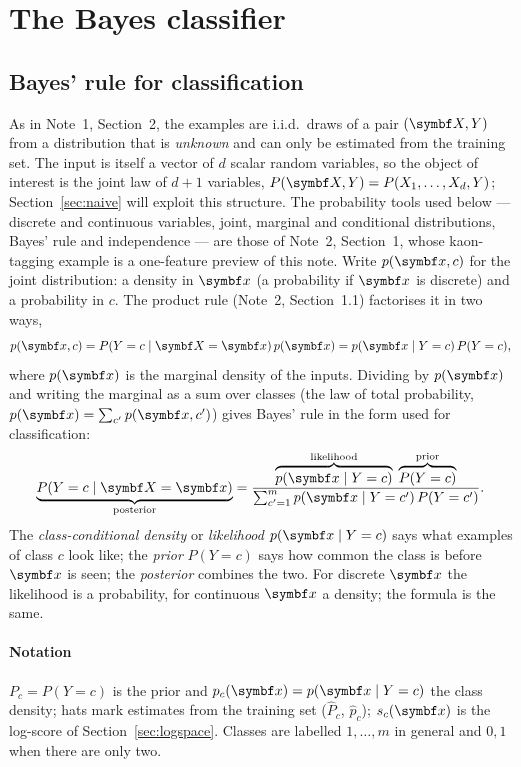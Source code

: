 \documentclass[11pt]{article}
\begin{document}
\section{The Bayes classifier}\label{sec:bayes}

\subsection{Bayes' rule for classification}

As in Note~1, Section~2, the examples are i.i.d.\ draws of a pair $(\X, Y)$ from a distribution that is \emph{unknown}
and can only be estimated from the training set. The input is itself a vector of $d$ scalar random variables, so the
object of interest is the joint law of $d + 1$ variables, $P(\X, Y) = P(X_1, \dots, X_d, Y)$; Section~\ref{sec:naive}
will exploit this structure. The probability tools used below --- discrete and continuous variables, joint, marginal and
conditional distributions, Bayes' rule and independence --- are those of Note~2, Section~1, whose kaon-tagging example is
a one-feature preview of this note. Write
$p(\x, c)$ for the joint distribution: a density in $\x$ (a probability if $\x$ is discrete) and a probability in $c$.
The product rule (Note~2, Section~1.1) factorises it in two ways,
\[
  p(\x, c) = P(Y = c \mid \X = \x)\, p(\x) = p(\x \mid Y = c)\, P(Y = c) ,
\]
where $p(\x)$ is the marginal density of the inputs. Dividing by $p(\x)$ and writing the marginal as a sum over
classes (the law of total probability, $p(\x) = \sum_{c'} p(\x, c')$) gives Bayes' rule in the form used for
classification:
\begin{equation}\label{eq:bayes}
  \underbrace{P(Y = c \mid \X = \x)}_{\text{posterior}}
  = \frac{\overbrace{p(\x \mid Y = c)}^{\text{likelihood}}\; \overbrace{P(Y = c)}^{\text{prior}}}
         {\sum_{c'=1}^{m} p(\x \mid Y = c')\, P(Y = c')} .
\end{equation}
The \emph{class-conditional density} or \emph{likelihood} $p(\x \mid Y = c)$ says what examples of class $c$ look
like; the \emph{prior} $P(Y = c)$ says how common the class is before $\x$ is seen; the \emph{posterior} combines the
two. For discrete $\x$ the likelihood is a probability, for continuous $\x$ a density; the formula is the same.

\paragraph{Notation} $P_c = P(Y = c)$ is the prior and $p_c(\x) = p(\x \mid Y = c)$ the class density; hats mark
estimates from the training set ($\hat P_c$, $\hat p_c$); $s_c(\x)$ is the log-score of Section~\ref{sec:logspace}.
Classes are labelled $1, \dots, m$ in general and $0, 1$ when there are only two.
\end{document}
